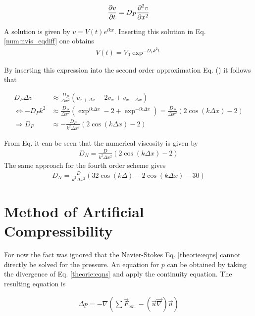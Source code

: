 \begin{align}
    \label{num:nvis_eqdiff}
    \pdn[v]{t} = D_P\pdn[^2v]{x^2}
\end{align}

A solution is given by $v = V(t)e^{ikx}$. Inserting this solution in Eq. \ref{num:nvis_eqdiff} one obtains
\begin{align}
    V(t) = V_0 \exp^{-D_Pk^2t}
\end{align}

By inserting this expression into the second order approximation Eq. () it
follows that

\begin{align}
                      D_P \Delta v  &\approx \frac{D_P}{\Delta x^2} \left(v_{x+\Delta x} - 2 v_x + v_{x - \Delta x}\right) \\
    \Leftrightarrow   -D_P k^2        &\approx \frac{D_P}{\Delta x^2} \left(\exp^{ik\Delta x} - 2 + \exp^{-ik\Delta x}\right) =   \frac{D_P}{\Delta x^2} \left(2\cos(k\Delta x) - 2\right)\\
    \Rightarrow   D_P      &\approx - \frac{D_P}{k^2 \Delta x^2} \left(2\cos(k\Delta x) - 2\right)
\end{align}

From Eq. it can be seen that the numerical viscosity is given by
\begin{align}
 \label{NUMERIC:NUMVIS}
    D_N = \frac{D}{k^2 \Delta x^2} \left(2\cos(k\Delta x) - 2\right)
\end{align}
The same approach for the fourth order scheme gives
\begin{align}
 \label{NUMERIC:NUMVIS2}
    D_N = \frac{D}{k^2 \Delta x^2} \left(32\cos(k\Delta ) - 2\cos(k\Delta x) - 30\right)
\end{align}
\clearpage



\section{Method of Artificial Compressibility}

For now the fact was ignored that the Navier-Stokes Eq. \ref{theorie:eqns} cannot directly be solved for the pressure.
An equation for $p$ can be obtained by taking the divergence of Eq. \ref{theorie:eqns} and apply the continuity equation.
The resulting equation is \citep{QUOTE}

\begin{align}
    \Delta p =  -\nabla \left( \sum \vec{F}_{\text{ext.}} - (\vec{u} \vec{\nabla}) \vec{u}\right)
\end{align}

